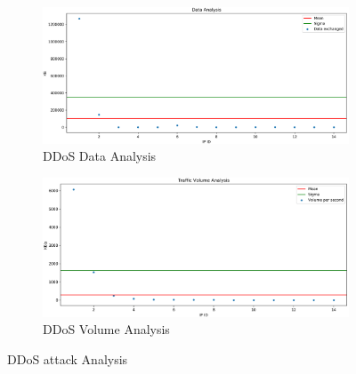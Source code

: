 \begin{figure}[h]
	\begin{subfigure}{0.48\textwidth}
		\includegraphics[width=\textwidth]{imgs/DDoSMixed-data_analysis}
		\caption{DDoS Data Analysis} 
		\label{fig:ddos_data}
	\end{subfigure}
	\hspace*{\fill} %
	\begin{subfigure}{0.48\textwidth}
		\includegraphics[width=\textwidth]{imgs/DDoSMixed-volume_analysis}
		\caption{DDoS Volume Analysis} 
		\label{fig:ddos_volume}
	\end{subfigure}
	\caption{DDoS attack Analysis}
	\label{fig:ddos_analysis}
\end{figure}

